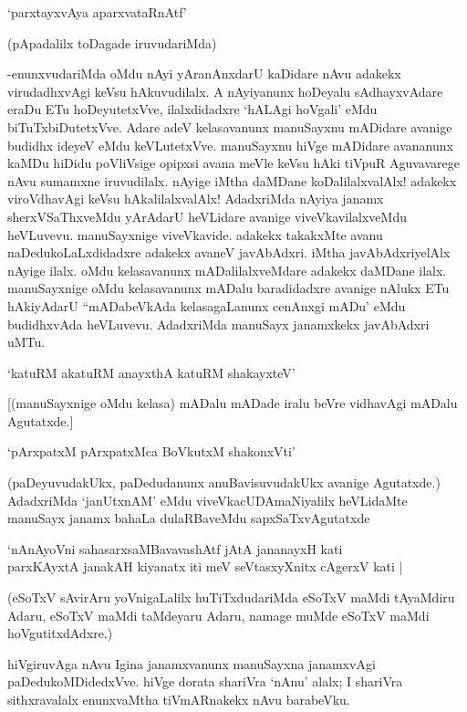 \begin{shloka}
`parxtayxvAya aparxvataRnAtf'
\end{shloka}

(pApadalilx toDagade iruvudariMda)

-enunxvudariMda oMdu nAyi yAranAnxdarU kaDidare nAvu adakekx virudadhxvAgi keVsu hAkuvudilalx. A nAyiyanunx hoDeyalu sAdhayxvAdare eraDu ETu hoDeyutetxVve, ilalxdidadxre `hALAgi hoVgali' eMdu biTuTxbiDutetxVve. Adare adeV kelasavanunx manuSayxnu mADidare avanige budidhx ideyeV eMdu keVLutetxVve. manuSayxnu hiVge mADidare avananunx kaMDu hiDidu poVliVsige opipxsi avana meVle keVsu hAki tiVpuR Aguvavarege nAvu sumamxne iruvudilalx. nAyige iMtha daMDane koDalilalxvalAlx! adakekx viroVdhavAgi keVsu hAkalilalxvalAlx! AdadxriMda nAyiya janamx sherxVSaThxveMdu yArAdarU heVLidare avanige viveVkavilalxveMdu heVLuvevu. manuSayxnige viveVkavide. adakekx takakxMte avanu naDedukoLaLxdidadxre adakekx avaneV javAbAdxri. iMtha javAbAdxriyelAlx nAyige ilalx. oMdu kelasavanunx mADalilalxveMdare adakekx daMDane ilalx. manuSayxnige oMdu kelasavanunx mADalu baradidadxre avanige nAlukx ETu hAkiyAdarU ``mADabeVkAda kelasagaLanunx cenAnxgi mADu' eMdu budidhxvAda heVLuvevu. AdadxriMda manuSayx janamxkekx javAbAdxri uMTu.

\begin{shloka}
`katuRM akatuRM anayxthA katuRM shakayxteV'
\end{shloka}

[(manuSayxnige oMdu kelasa) mADalu mADade iralu beVre vidhavAgi mADalu Agutatxde.]

\begin{shloka}
`pArxpatxM pArxpatxMca BoVkutxM shakonxVti'
\end{shloka}

(paDeyuvudakUkx, paDedudanunx anuBavisuvudakUkx avanige Agutatxde.) AdadxriMda `janUtxnAM' eMdu viveVkacUDAmaNiyalilx heVLidaMte manuSayx janamx bahaLa dulaRBaveMdu sapxSaTxvAgutatxde

\begin{shloka}
`nAnAyoVni sahasarxsaMBavavashAtf jAtA jananayxH kati\\
parxKAyxtA janakAH kiyanatx iti meV seVtasxyXnitx cAgerxV kati |
\end{shloka}

(eSoTxV sAvirAru yoVnigaLalilx huTiTxdudariMda eSoTxV maMdi tAyaMdiru Adaru, eSoTxV maMdi taMdeyaru Adaru, namage muMde eSoTxV maMdi hoVgutitxdAdxre.)

hiVgiruvAga nAvu Igina janamxvanunx manuSayxna janamxvAgi paDedukoMDidedxVve. hiVge dorata shariVra `nAnu' alalx; I shariVra sithxravalalx enunxvaMtha tiVmARnakekx nAvu barabeVku.

